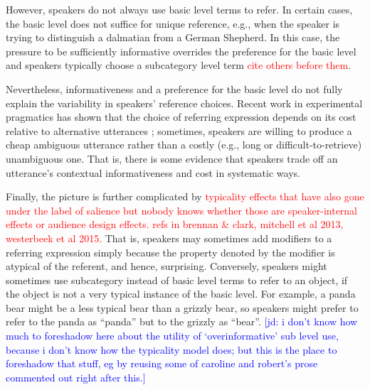 \documentclass[10pt,letterpaper]{article}
\newcommand{\red}[1]{\textcolor{Red}{#1}}
\newcommand{\jd}[1]{\textcolor{Blue}{[jd: #1]}}
\begin{document}
However, speakers do not always use basic level terms to refer. In certain cases, the basic level does not suffice for unique reference, e.g., when the speaker is trying to distinguish a dalmatian from a German Shepherd. In this case, the pressure to be sufficiently informative \cite<as in the Maxim of Quantity:>{grice1975} overrides the preference for the basic level and speakers typically choose a subcategory level term \cite{brennan1996} \red{cite others before them}. 

Nevertheless, informativeness and a preference for the basic level do not fully explain the variability in speakers' reference choices. Recent work in experimental pragmatics has shown that the choice of referring expression depends on its cost relative to alternative utterances \cite{rohde2012, degenfrankejaeger2013}; sometimes, speakers are willing to produce a cheap ambiguous utterance rather than a costly (e.g., long or difficult-to-retrieve) unambiguous one. That is, there is some evidence that speakers trade off an utterance's contextual informativeness and cost in systematic ways.

Finally, the picture is further complicated by \red{typicality effects that have also gone under the label of salience but nobody knows whether those are speaker-internal effects or audience design effects. refs in brennan \& clark, mitchell et al 2013, westerbeek et al 2015.} That is, speakers may sometimes add modifiers to a referring expression simply because the property denoted by the modifier is atypical of the referent, and hence, surprising. Conversely, speakers might sometimes use subcategory instead of basic level terms to refer to an object, if the object is not a very typical instance of the basic level. For example, a panda  bear might be a less typical bear than a grizzly bear, so speakers might prefer to refer to the panda as ``panda'' but to the grizzly as ``bear''.
\jd{i don't know how much to foreshadow here about the utility of `overinformative' sub level use, because i don't know how the typicality model does; but this is the place to foreshadow that stuff, eg by reusing some of caroline and robert's prose commented out right after this.}
\end{document}
